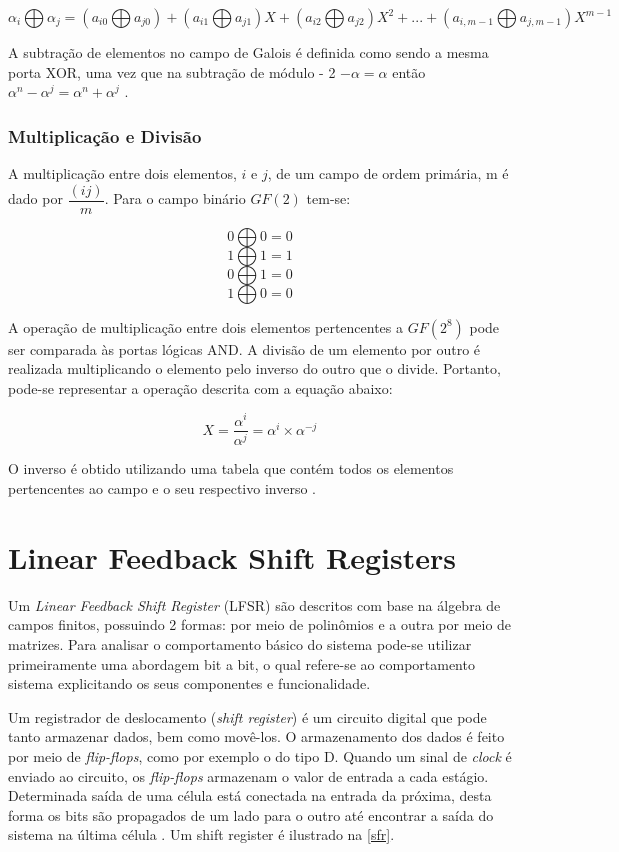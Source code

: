 $$\alpha_{i} \bigoplus \alpha_{j} = (a_{i0} \bigoplus a_{j0}) + (a_{i1} \bigoplus a_{j1})X + (a_{i2} \bigoplus a_{j2})X^{2} + ... + (a_{i,m - 1} \bigoplus a_{j,m - 1})X^{m - 1}$$

A subtração de elementos no campo de Galois é definida como sendo a mesma porta XOR, uma vez que na subtração de módulo - 2 $ - \alpha = \alpha$ então $\alpha^{n}  - \alpha^{j} = \alpha^{n} + \alpha^{j}$ \cite{Robson2010}.

\subsection{Multiplicação e Divisão}
A multiplicação entre dois elementos, $i$ e $j$, de um campo de ordem primária, m é dado por $\dfrac{(ij)}{m}$. Para o campo binário $GF(2)$ tem-se:

$$0 \bigoplus 0 = 0$$
$$1 \bigoplus 1 = 1$$
$$0 \bigoplus 1 = 0$$
$$1 \bigoplus 0 = 0$$

A operação de multiplicação entre dois elementos pertencentes a $GF(2^{8})$ pode ser comparada às portas lógicas AND. A divisão de um elemento por outro é realizada multiplicando o elemento pelo inverso do outro que o divide. Portanto, pode-se representar a operação descrita com a equação abaixo: 

$$X = \dfrac{\alpha^{i}}{\alpha^{j}}= \alpha^{i} \times \alpha^{- j} $$

O inverso é obtido utilizando uma tabela que contém todos os elementos pertencentes ao campo e o seu respectivo inverso \cite{Robson2010}. 

\chapter[Linear Feedback Shift Registers]{Linear Feedback Shift Registers} \label{teo:lfsr}

Um \textit{Linear Feedback Shift Register} (LFSR) são descritos com base na álgebra de campos finitos, possuindo 2 formas: por meio de polinômios e a outra por meio de matrizes. Para analisar o comportamento básico do sistema pode-se utilizar primeiramente uma abordagem bit a bit, o qual refere-se ao comportamento sistema explicitando os seus componentes e funcionalidade. 

Um registrador de deslocamento (\textit{shift register}) é um circuito digital que pode tanto armazenar dados, bem como movê-los. O armazenamento dos dados é feito por meio de \textit{flip-flops}, como por exemplo o do tipo D. Quando um sinal de \textit{clock} é enviado ao circuito, os \textit{flip-flops} armazenam o valor de entrada a cada estágio. Determinada saída de uma célula está conectada na entrada da próxima, desta forma os bits são propagados de um lado para o outro até encontrar a saída do sistema na última célula \cite{Floyd2002}. Um  shift register é ilustrado na \autoref{sfr}.

